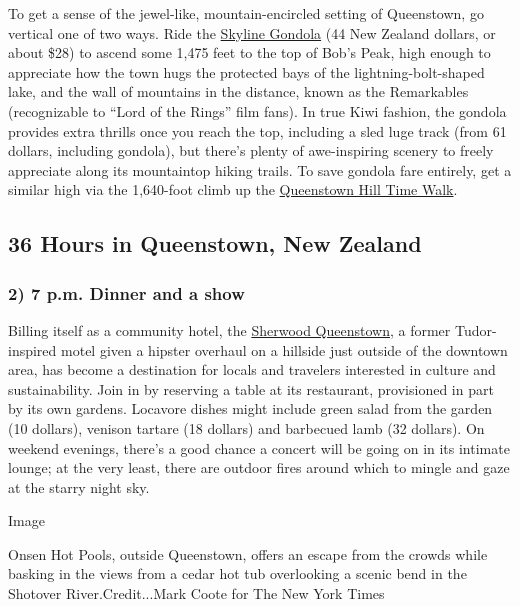 To get a sense of the jewel-like, mountain-encircled setting of
Queenstown, go vertical one of two ways. Ride the
\href{https://www.skyline.co.nz/en/queenstown/}{Skyline Gondola} (44 New
Zealand dollars, or about \$28) to ascend some 1,475 feet to the top of
Bob's Peak, high enough to appreciate how the town hugs the protected
bays of the lightning-bolt-shaped lake, and the wall of mountains in the
distance, known as the Remarkables (recognizable to ``Lord of the
Rings'' film fans). In true Kiwi fashion, the gondola provides extra
thrills once you reach the top, including a sled luge track (from 61
dollars, including gondola), but there's plenty of awe-inspiring scenery
to freely appreciate along its mountaintop hiking trails. To save
gondola fare entirely, get a similar high via the 1,640-foot climb up
the
\href{https://www.newzealand.com/us/feature/queenstown-hill-time-walk/}{Queenstown
Hill Time Walk}.

\hypertarget{36-hours-in-queenstown-new-zealand-1}{%
\subsection{36 Hours in Queenstown, New
Zealand}\label{36-hours-in-queenstown-new-zealand-1}}

\hypertarget{2-7-pm-dinner-and-a-show}{%
\subsubsection{\texorpdfstring{\textbf{2) 7 p.m. Dinner and a
show}}{2) 7 p.m. Dinner and a show}}\label{2-7-pm-dinner-and-a-show}}

Billing itself as a community hotel, the
\href{https://sherwoodqueenstown.nz/}{Sherwood Queenstown}, a former
Tudor-inspired motel given a hipster overhaul on a hillside just outside
of the downtown area, has become a destination for locals and travelers
interested in culture and sustainability. Join in by reserving a table
at its restaurant, provisioned in part by its own gardens. Locavore
dishes might include green salad from the garden (10 dollars), venison
tartare (18 dollars) and barbecued lamb (32 dollars). On weekend
evenings, there's a good chance a concert will be going on in its
intimate lounge; at the very least, there are outdoor fires around which
to mingle and gaze at the starry night sky.

Image

Onsen Hot Pools, outside Queenstown, offers an escape from the crowds
while basking in the views from a cedar hot tub overlooking a scenic
bend in the Shotover River.Credit...Mark Coote for The New York Times

